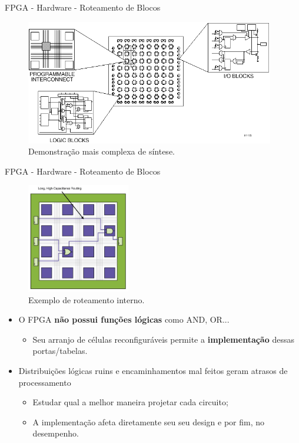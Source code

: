 	\begin{frame}{FPGA - Hardware - Roteamento de Blocos}
		\begin{figure}[H]
			\centering
			\includegraphics[width=0.97\textwidth]{img/fpga/demonstracao_2.png}
			\caption{Demonstração mais complexa de síntese.}
		\end{figure}
	\end{frame}


	\begin{frame}{FPGA - Hardware - Roteamento de Blocos}
		\begin{multicols}{2}
			\begin{figure}[h]
				\centering
				\includegraphics[width=0.40\textwidth]{img/fpga/exemploInicial.png}
				\caption{Exemplo de roteamento interno.}
				\label{fig:exemploInicial}
			\end{figure}
			\columnbreak
			\begin{itemize}
				\setlength\itemsep{1em}
				\item O FPGA \textbf{não possui funções lógicas} como AND, OR...
				\begin{itemize}
					\item Seu arranjo de células reconfiguráveis permite a \textbf{implementação} dessas portas/tabelas.
				\end{itemize}

				\item Distribuições lógicas ruins e encaminhamentos mal feitos geram atrasos de processamento
				\begin{itemize}
					\setlength\itemsep{0.3em}
					\item Estudar qual a melhor maneira projetar cada circuito;

					\item A implementação afeta diretamente seu seu design e por fim, no desempenho.
				\end{itemize}

			\end{itemize}
		\end{multicols}
	\end{frame}

